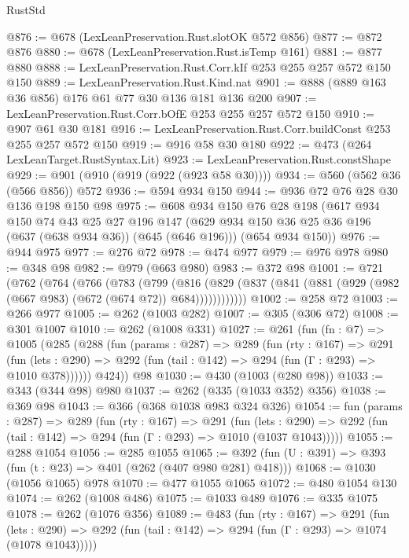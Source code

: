 \begin{lexlean}{RustStd}
\begin{coremodule}
@876 := @678 (LexLeanPreservation.Rust.slotOK @572 @856)
@877 := @872 @876
@880 := @678 (LexLeanPreservation.Rust.isTemp @161)
@881 := @877 @880
@888 := LexLeanPreservation.Rust.Corr.kIf @253 @255 @257 @572 @150 @150
@889 := LexLeanPreservation.Rust.Kind.nat
@901 := @888 (@889 @163 @36 @856) @176 @61 @77 @30 @136 @181 @136 @200
@907 := LexLeanPreservation.Rust.Corr.bOfE @253 @255 @257 @572 @150
@910 := @907 @61 @30 @181
@916 := LexLeanPreservation.Rust.Corr.buildConst @253 @255 @257 @572 @150
@919 := @916 @58 @30 @180
@922 := @473 (@264 LexLeanTarget.RustSyntax.Lit)
@923 := LexLeanPreservation.Rust.constShape
@929 := @901 (@910 (@919 (@922 (@923 @58 @30))))
@934 := @560 (@562 @36 (@566 @856)) @572
@936 := @594 @934 @150
@944 := @936 @72 @76 @28 @30 @136 @198 @150 @98
@975 := @608
    @934
    @150
    @76
    @28
    @198
    (@617
      @934
      @150
      @74
      @43
      @25
      @27
      @196
      @147
      (@629 @934 @150 @36 @25 @36 @196 (@637 (@638 @934 @36)) (@645 (@646 @196)))
      (@654 @934 @150))
@976 := @944 @975
@977 := @276 @72
@978 := @474 @977
@979 := @976 @978
@980 := @348 @98
@982 := @979 (@663 @980)
@983 := @372 @98
@1001 := @721
    (@762
      (@764
        (@766
          (@783
            (@799
              (@816
                (@829 (@837 (@841 (@881 (@929 (@982 (@667 @983) (@672 (@674 @72)) @684))))))))))))
@1002 := @258 @72
@1003 := @266 @977
@1005 := @262 (@1003 @282)
@1007 := @305 (@306 @72)
@1008 := @301 @1007
@1010 := @262 (@1008 @331)
@1027 := @261
    (fun (fn : @7) =>
    @1005
      (@285
        (@288
          (fun (params : @287) =>
          @289
            (fun (rty : @167) =>
            @291
              (fun (lets : @290) =>
              @292 (fun (tail : @142) => @294 (fun (Γ : @293) => @1010 @378))))))
        @424))
    @98
@1030 := @430 (@1003 (@280 @98))
@1033 := @343 (@344 @98) @980
@1037 := @262 (@335 (@1033 @352) @356)
@1038 := @369 @98
@1043 := @366 (@368 @1038 @983 @324 @326)
@1054 := fun (params : @287) =>
  @289
    (fun (rty : @167) =>
    @291
      (fun (lets : @290) =>
      @292 (fun (tail : @142) => @294 (fun (Γ : @293) => @1010 (@1037 @1043)))))
@1055 := @288 @1054
@1056 := @285 @1055
@1065 := @392 (fun (U : @391) => @393 (fun (t : @23) => @401 (@262 (@407 @980 @281) @418)))
@1068 := @1030 (@1056 @1065) @978
@1070 := @477 @1055 @1065
@1072 := @480 @1054 @130
@1074 := @262 (@1008 @486)
@1075 := @1033 @489
@1076 := @335 @1075
@1078 := @262 (@1076 @356)
@1089 := @483
    (fun (rty : @167) =>
    @291
      (fun (lets : @290) =>
      @292 (fun (tail : @142) => @294 (fun (Γ : @293) => @1074 (@1078 @1043)))))

\end{coremodule}
\end{lexlean}
